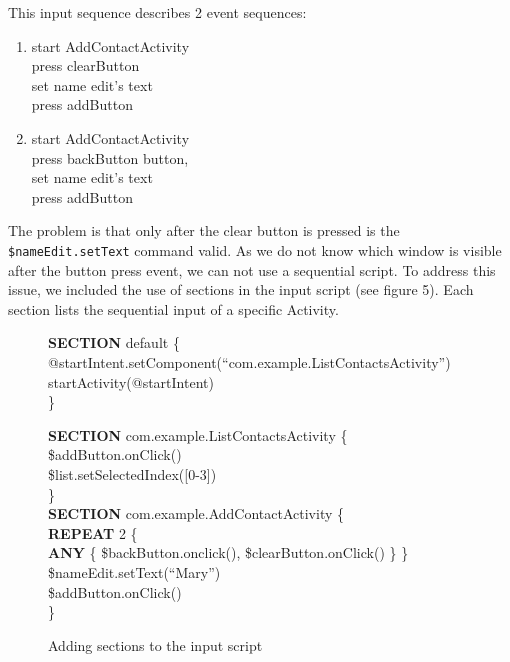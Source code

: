 \documentclass{acm_proc_article-sp}
\begin{document}
This input sequence describes 2 event sequences:
\begin{enumerate}
 \item start AddContactActivity\\
press clearButton\\
set name edit's text\\
press addButton
 \item start AddContactActivity\\
 press backButton button, \\
 set name edit's text\\
 press addButton
\end{enumerate}

The problem is that only after the clear button is pressed is the \texttt{\$nameEdit.setText} command valid. As we do not know
which window is visible after the button press event, we can not use a sequential script. To address this issue, we included the use of
sections in the input script (see figure 5). Each section lists the sequential input of a specific Activity.

\begin{figure}
{\small
{\sf 
\textbf{SECTION} default \{\\
\hspace*{5mm}@startIntent.setComponent(``com.example.ListContactsActivity'')\\
\hspace*{5mm}startActivity(@startIntent)\\
\}

\textbf{SECTION} com.example.ListContactsActivity \{\\
\hspace*{5mm}\$addButton.onClick()\\
\hspace*{5mm}\$list.setSelectedIndex([0-3])\\
\}\\

\textbf{SECTION} com.example.AddContactActivity \{\\
\hspace*{5mm}\textbf{REPEAT} 2 \{\\
\hspace*{7mm}\textbf{ANY} \{ \$backButton.onclick(), \$clearButton.onClick()  \}
\hspace*{5mm}\}\\
\hspace*{5mm}\$nameEdit.setText(``Mary'')\\
\hspace*{5mm}\$addButton.onClick()\\
\}
}
}
\caption{Adding sections to the input script}
\end{figure}
\end{document}
